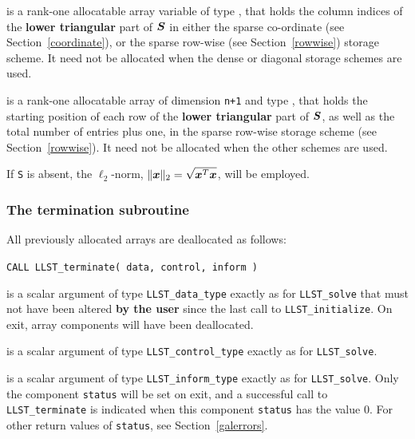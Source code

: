 \documentclass{galahad}
\newcommand{\packagename}{LLST}
\begin{document}
\begin{description}
\begin{description}
 is a rank-one allocatable array variable of type \integer,
that holds the column indices of the {\bf lower triangular} part of
${\bm{S}}$ in either the sparse co-ordinate
(see Section~\ref{coordinate}), or the sparse row-wise
(see Section~\ref{rowwise}) storage scheme.
It need not be allocated when the dense or diagonal storage schemes are used.

 is a rank-one allocatable array of dimension {\tt n+1} and type
\integer, that holds the starting position of
each row of the {\bf lower triangular} part of ${\bm{S}}$, as well
as the total number of entries plus one, in the sparse row-wise storage
scheme (see Section~\ref{rowwise}). It need not be allocated when the
other schemes are used.

\end{description}
If {\tt S} is absent, the $\ell_2$-norm, $\|{\bm{x}}\|_2 = \sqrt{{\bm{x}}^T {\bm{x}}}$,
will be employed.


\end{description}


\subsubsection{The  termination subroutine}
All previously allocated arrays are deallocated as follows:

\hskip0.5in
{\tt CALL \packagename\_terminate( data, control, inform )}

\begin{description}

 is a scalar \intentinout argument of type
{\tt \packagename\_data\_type}
exactly as for
{\tt \packagename\_solve}
that must not have been altered {\bf by the user} since the last call to
{\tt \packagename\_initialize}.
On exit, array components will have been deallocated.

 is a scalar \intentin argument of type
{\tt \packagename\_control\_type}
exactly as for
{\tt \packagename\_solve}.

 is a scalar \intentout argument of type
{\tt \packagename\_inform\_type}
exactly as for
{\tt \packagename\_solve}.
Only the component {\tt status} will be set on exit, and a
successful call to
{\tt \packagename\_terminate}
is indicated when this  component {\tt status} has the value 0.
For other return values of {\tt status}, see Section~\ref{galerrors}.

\end{description}
\end{document}
